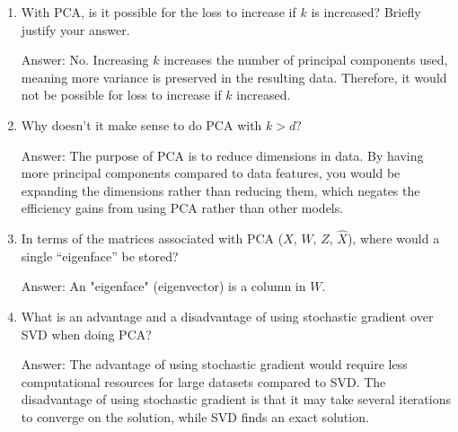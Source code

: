 \documentclass{article}
\newcommand{\gre}[1]{\textcolor{gre}{#1}}
\newcommand\ans[1]{\par\gre{Answer: #1}}
\begin{document}
\begin{enumerate}
\item With PCA, is it possible for the loss to increase if $k$ is increased? Briefly justify your answer.

\ans{No. Increasing $k$ increases the number of principal components used, meaning more variance is preserved in the resulting data. Therefore, it would not be possible for loss to increase if $k$ increased.}

\item Why doesn't it make sense to do PCA with $k > d$?

\ans{The purpose of PCA is to reduce dimensions in data. By having more principal components compared to data features, you would be expanding the dimensions rather than reducing them, which negates the efficiency gains from using PCA rather than other models.}

\item In terms of the matrices associated with PCA ($X$, $W$, $Z$, $\hat{X}$), where would a single ``eigenface'' be stored?
\ans{An "eigenface" (eigenvector) is a column in $W$.}

\item What is an advantage and a disadvantage of using stochastic gradient over SVD when doing PCA?

\ans{The advantage  of using stochastic gradient would require less computational resources for large datasets compared to SVD. The disadvantage of using stochastic gradient is that it may take several iterations to converge on the solution, while SVD finds an exact solution.}

\end{enumerate}
\end{document}
